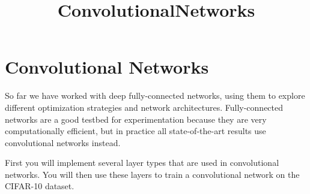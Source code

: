 \documentclass[11pt]{article}
\title{ConvolutionalNetworks}
\begin{document}
    
    
    \maketitle
    
    

    
    \section{Convolutional Networks}\label{convolutional-networks}

So far we have worked with deep fully-connected networks, using them to
explore different optimization strategies and network architectures.
Fully-connected networks are a good testbed for experimentation because
they are very computationally efficient, but in practice all
state-of-the-art results use convolutional networks instead.

First you will implement several layer types that are used in
convolutional networks. You will then use these layers to train a
convolutional network on the CIFAR-10 dataset.
\end{document}
